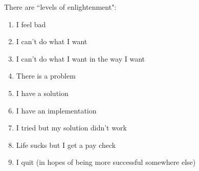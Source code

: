 There are ``levels of enlightenment":
\begin{enumerate}
    \item I feel bad
    \item I can't do what I want
    \item I can't do what I want in the way I want
    \item There is a problem
    \item I have a solution
    \item I have an implementation
    \item I tried but my solution didn't work
    \item Life sucks but I get a pay check
    \item I quit (in hopes of being more successful somewhere else)
\end{enumerate}
